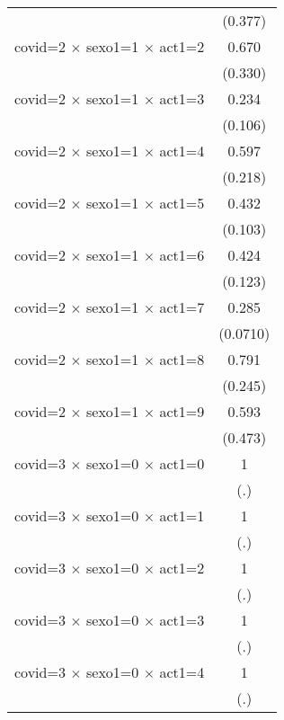 {\begin{tabular}{l*{1}{c}}
                    &     (0.377)         \\
[1em]
covid=2 $\times$ sexo1=1 $\times$ act1=2&       0.670         \\
                    &     (0.330)         \\
[1em]
covid=2 $\times$ sexo1=1 $\times$ act1=3&       0.234\sym{**} \\
                    &     (0.106)         \\
[1em]
covid=2 $\times$ sexo1=1 $\times$ act1=4&       0.597         \\
                    &     (0.218)         \\
[1em]
covid=2 $\times$ sexo1=1 $\times$ act1=5&       0.432\sym{***}\\
                    &     (0.103)         \\
[1em]
covid=2 $\times$ sexo1=1 $\times$ act1=6&       0.424\sym{**} \\
                    &     (0.123)         \\
[1em]
covid=2 $\times$ sexo1=1 $\times$ act1=7&       0.285\sym{***}\\
                    &    (0.0710)         \\
[1em]
covid=2 $\times$ sexo1=1 $\times$ act1=8&       0.791         \\
                    &     (0.245)         \\
[1em]
covid=2 $\times$ sexo1=1 $\times$ act1=9&       0.593         \\
                    &     (0.473)         \\
[1em]
covid=3 $\times$ sexo1=0 $\times$ act1=0&           1         \\
                    &         (.)         \\
[1em]
covid=3 $\times$ sexo1=0 $\times$ act1=1&           1         \\
                    &         (.)         \\
[1em]
covid=3 $\times$ sexo1=0 $\times$ act1=2&           1         \\
                    &         (.)         \\
[1em]
covid=3 $\times$ sexo1=0 $\times$ act1=3&           1         \\
                    &         (.)         \\
[1em]
covid=3 $\times$ sexo1=0 $\times$ act1=4&           1         \\
                    &         (.)         \\

\end{tabular}}
